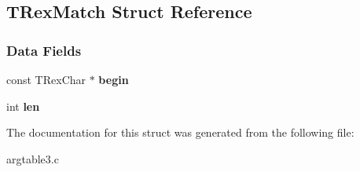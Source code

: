 \hypertarget{structTRexMatch}{}\subsection{T\+Rex\+Match Struct Reference}
\label{structTRexMatch}
\subsubsection*{Data Fields}
\begin{DoxyCompactItemize}
\item 
\mbox{\label{structTRexMatch_ac855b7327c66c06de72b44f13f3710d4}} 
const T\+Rex\+Char $\ast$ {\bfseries begin}
\item 
\mbox{\label{structTRexMatch_a35c1748bcb4d876e2ef5385a14641c2a}} 
int {\bfseries len}
\end{DoxyCompactItemize}


The documentation for this struct was generated from the following file\+:\begin{DoxyCompactItemize}
\item 
argtable3.\+c\end{DoxyCompactItemize}
